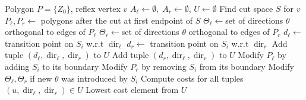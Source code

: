\documentclass[../main.tex]{subfiles}
\begin{document}
\begin{algorithm}
	\caption{$\operatorname{find\_optimal\_cut}(P, v)$}
	\label{alg:optimal_cut}
	\begin{algorithmic}[1]
		\REQUIRE Polygon $P=\{Z_0\}$, reflex vertex $v$
			\STATE $A_{\ell}\gets\emptyset,\;A_r\gets\emptyset$, $U\gets\emptyset$
			\STATE Find cut space $S$ for $v$	\label{line:algo_cut_space}
			\STATE $P_{\ell},P_r\gets$ polygons after the cut at first endpoint of $S$ \label{line:cut_two_polygons}
			\STATE $\Theta_{\ell}\gets$set of directions $\theta$ orthogonal to edges of $P_{\ell}$ \label{line:cut_two_sets}
			\STATE $\Theta_r\gets$set of directions $\theta$ orthogonal to edges of $P_r$ \label{line:cut_two_sets_2}
			 \label{line:opt_cut_for}
						\STATE $d_{\ell}\gets$ transition point on $S_i$ w.r.t $\operatorname{dir}_{\ell}$	\label{line:cand_trans_pt} 
						\STATE $d_r\gets$ transition point on $S_i$ w.r.t $\operatorname{dir}_r$ \label{line:cand_trans_pt_2}						
						\STATE Add tuple $(d_{\ell}, \operatorname{dir}_{\ell}, \operatorname{dir}_r)$ to $U$
						\STATE Add tuple $(d_r, \operatorname{dir}_{\ell}, \operatorname{dir}_r)$ to $U$
					\ENDFOR
				\ENDFOR
				\STATE Modify $P_{\ell}$ by adding $S_i$ to its boundary \label{line:cut_modify_1}
				\STATE Modify $P_r$ by removing $S_i$ from its boundary \label{line:cut_modify_2}
				\STATE Modify $\Theta_{\ell},\Theta_r$ if new $\theta$ was introduced by $S_i$ \label{line:opt_cut_end_for}
			\ENDFOR 
			\STATE Compute costs for all tuples $(u, \operatorname{dir}_{\ell}, \operatorname{dir}_r)\in U$ \label{line:sort_tuples}
			\RETURN Lowest cost element from $U$
	\end{algorithmic}
\end{algorithm}
\end{document}
